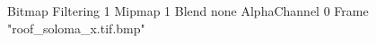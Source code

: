 {Bitmap
	{Filtering 1}
	{Mipmap 1}
	{Blend none}
	{AlphaChannel 0}
	{Frame "roof_soloma_x.tif.bmp"}
}
